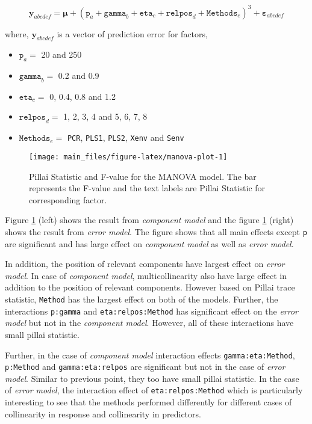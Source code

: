 \documentclass[12pt,3p,authoryear]{elsarticle}
\providecommand{\tightlist}{%
  \setlength{\itemsep}{0pt}\setlength{\parskip}{0pt}}
\begin{document}
\begin{equation}
\mathbf{y}_{abcdef} = \boldsymbol{\mu} + (\texttt{p}_a + \texttt{gamma}_b + \texttt{eta}_c + \texttt{relpos}_d + \texttt{Methods}_e)^3 + \boldsymbol{\varepsilon}_{abcdef}
\label{eq:expanded-model}
\end{equation}

where, \(\mathbf{y}_{abcdef}\) is a vector of prediction error for
factors,

\begin{itemize}
\tightlist
\item
  \(\texttt{p}_a =\) 20 and 250
\item
  \(\texttt{gamma}_b=\) 0.2 and 0.9
\item
  \(\texttt{eta}_c=\) 0, 0.4, 0.8 and 1.2
\item
  \(\texttt{relpos}_d=\) 1, 2, 3, 4 and 5, 6, 7, 8
\item
  \(\texttt{Methods}_e=\) \texttt{PCR}, \texttt{PLS1}, \texttt{PLS2},
  \texttt{Xenv} and \texttt{Senv}
\end{itemize}





\begin{figure}
\texttt{[image: main\_files/figure-latex/manova-plot-1]} \caption{Pillai Statistic and F-value for the MANOVA model. The
bar represents the F-value and the text labels are Pillai Statistic for
corresponding factor.}\label{fig:manova-plot}
\end{figure}

Figure \ref{fig:manova-plot} (left) shows the result from
\emph{component model} and the figure \ref{fig:manova-plot} (right)
shows the result from \emph{error model}. The figure shows that all main
effects except \texttt{p} are significant and has large effect on
\emph{component model} as well as \emph{error model}.

In addition, the position of relevant components have largest effect on
\emph{error model}. In case of \emph{component model}, multicollinearity
also have large effect in addition to the position of relevant
components. However based on Pillai trace statistic, \texttt{Method} has
the largest effect on both of the models. Further, the interactions
\texttt{p:gamma} and \texttt{eta:relpos:Method} has significant effect
on the \emph{error model} but not in the \emph{component model}.
However, all of these interactions have small pillai statistic.

Further, in the case of \emph{component model} interaction effects
\texttt{gamma:eta:Method}, \texttt{p:Method} and
\texttt{gamma:eta:relpos} are significant but not in the case of
\emph{error model}. Similar to previous point, they too have small
pillai statistic. In the case of \emph{error model}, the interaction
effect of \texttt{eta:relpos:Method} which is particularly interesting
to see that the methods performed differently for different cases of
collinearity in response and collinearity in predictors.
\end{document}
